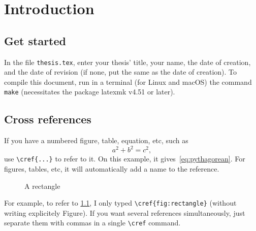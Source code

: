 %
%
%
\chapter{Introduction}
\label{ch:introduction}

\section{Get started}

In the file \verb|thesis.tex|, enter your thesis' title, your name, the date of creation, and the date of revision (if none, put the same as the date of creation).
To compile this document, run in a terminal (for Linux and macOS) the command \verb|make| (necessitates the package latexmk v4.51 or later).

\section{Cross references}

If you have a numbered figure, table, equation, etc, such as
\begin{equation}
    \label{eq:pythagorean}
    a^2 + b^2 = c^2,
\end{equation}
use \verb|\cref{...}| to refer to it.
On this example, it gives~\cref{eq:pythagorean}.
For figures, tables, etc, it will automatically add a name to the reference.

\begin{figure}[ht]
    \centering
    \caption{A rectangle}
    \label{fig:rectangle}
\end{figure}

For example, to refer to \cref{fig:rectangle}, I only typed \verb|\cref{fig:rectangle}| (without writing explicitely Figure).
If you want several references simultaneously, just separate them with commas in a single \verb|\cref| command.

